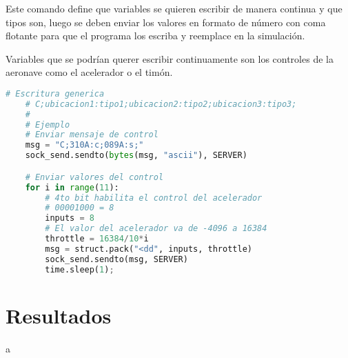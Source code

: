 Este comando define que variables se quieren escribir de manera continua y que tipos son, luego se deben enviar los valores en formato de número con coma flotante para que el programa los escriba y reemplace en la simulación.

Variables que se podrían querer escribir continuamente son los controles de la aeronave como el acelerador o el timón.

\begin{lstlisting}[language=Python]
	# Escritura generica
	# C;ubicacion1:tipo1;ubicacion2:tipo2;ubicacion3:tipo3;
	#
	# Ejemplo
	# Enviar mensaje de control
	msg = "C;310A:c;089A:s;"
	sock_send.sendto(bytes(msg, "ascii"), SERVER)

	# Enviar valores del control
	for i in range(11):
		# 4to bit habilita el control del acelerador
		# 00001000 = 8
		inputs = 8
		# El valor del acelerador va de -4096 a 16384
		throttle = 16384/10*i
		msg = struct.pack("<dd", inputs, throttle)
		sock_send.sendto(msg, SERVER)
		time.sleep(1);
\end{lstlisting}

\section{Resultados}

a